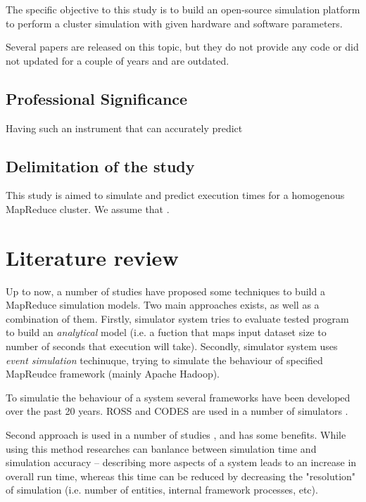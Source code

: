 \documentclass[conference]{IEEEtran}
\newcommand*{\TODO}[1]{{\color{red}{TODO: \textit{#1}}}}
\begin{document}
    The specific objective to this study is to build an open-source simulation platform to perform a cluster simulation with given hardware and software parameters. 

    Several papers are released on this topic, but they do not provide any code \cite{baseline_model} or did not updated for a couple of years \cite{yarnsim} and are outdated.

    \subsection{Professional Significance}

    Having such an instrument that can accurately predict 

    \subsection{Delimitation of the study}
    \label{assumptions}
    This study is aimed to simulate and predict execution times for a homogenous MapReduce cluster. We assume that \TODO{Assumptions}.

    \section{Literature review}
    \label{literature_review}
        Up to now, a number of studies have proposed some techniques to build a MapReduce simulation models. Two main approaches exists, as well as a combination of them. Firstly, simulator system tries to evaluate tested program to build an \textit{analytical} model (i.e. a fuction that maps input dataset size to number of seconds that execution will take). Secondly, simulator system uses \textit{event simulation} techinuque, trying to simulate the behaviour of specified MapReudce framework (mainly Apache Hadoop).
        
        To simulatie the behaviour of a system several frameworks have been developed over the past 20 years. ROSS \cite{ross} and CODES \cite{codes} are used in a number of simulators \TODO{citiation}. 

        Second approach is used in a number of studies \cite{yarnsim} \cite{baseline_model}, and has some benefits. While using this method researches can banlance between simulation time and simulation accuracy -- describing more aspects of a system leads to an increase in overall run time, whereas this time can be reduced by decreasing the "resolution" of simulation (i.e. number of entities, internal framework processes, etc).  
\end{document}
